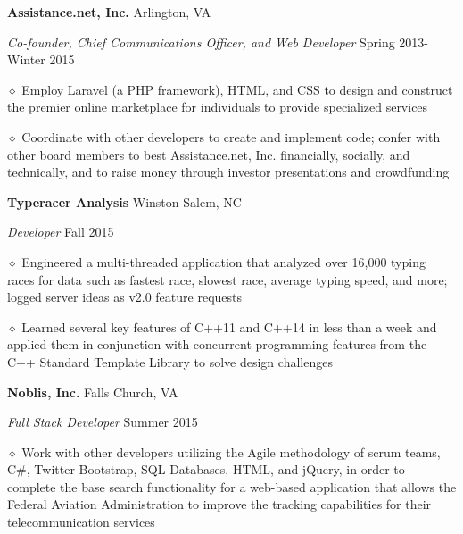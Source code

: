 \documentclass[executivepaper]{extarticle}
\begin{document}
\begin{center}
{\begin{minipage}{7.0in}
{\noindent \textbf{\fontsize{9}{8}\selectfont Assistance.net, Inc.}} {\hfill \fontsize{9}{8}\selectfont Arlington, VA}

{\noindent \textit{\fontsize{9}{8}\selectfont Co-founder, Chief Communications Officer, and Web Developer}} {\hfill \fontsize{9}{8}\selectfont Spring 2013-Winter 2015}

{\noindent $\diamond$ {\fontsize{9}{8}\selectfont Employ Laravel (a PHP framework), HTML, and CSS to design and construct the premier online marketplace for individuals to provide specialized services}}

{\noindent $\diamond$ {\fontsize{9}{8}\selectfont Coordinate with other developers to create and implement code; confer with other board members to best Assistance.net, Inc. financially, socially, and technically,
and to raise money through investor presentations and crowdfunding}}

{\noindent \textbf{\fontsize{9}{8}\selectfont Typeracer Analysis}} {\hfill \fontsize{9}{8}\selectfont Winston-Salem, NC}

{\noindent \textit{\fontsize{9}{8}\selectfont Developer}} {\hfill \fontsize{9}{8}\selectfont Fall 2015}

{\noindent $\diamond$ {\fontsize{9}{8}\selectfont Engineered a multi-threaded application that analyzed over 16,000 typing races for data such as fastest race, slowest race, average typing speed, and more; logged server ideas as v2.0 feature requests}}

{\noindent $\diamond$ {\fontsize{9}{8}\selectfont Learned several key features of C++11 and C++14 in less than a week and applied them in conjunction with concurrent programming features from the C++ Standard Template Library to solve design challenges}}

{\noindent \textbf{\fontsize{9}{8}\selectfont Noblis, Inc.}} {\hfill \fontsize{9}{8}\selectfont Falls Church, VA}

{\noindent \textit{\fontsize{9}{8}\selectfont Full Stack Developer}} {\hfill \fontsize{9}{8}\selectfont Summer 2015}

{\noindent $\diamond$ {\fontsize{9}{8}\selectfont Work with other developers utilizing the Agile methodology of scrum teams, C\#, Twitter Bootstrap, SQL Databases, HTML, and jQuery, in order to complete
the base search functionality for a web-based application that allows the Federal Aviation Administration to improve the tracking capabilities for their telecommunication services}}

\vspace{3mm}


\end{minipage}}
\end{center}
\end{document}

